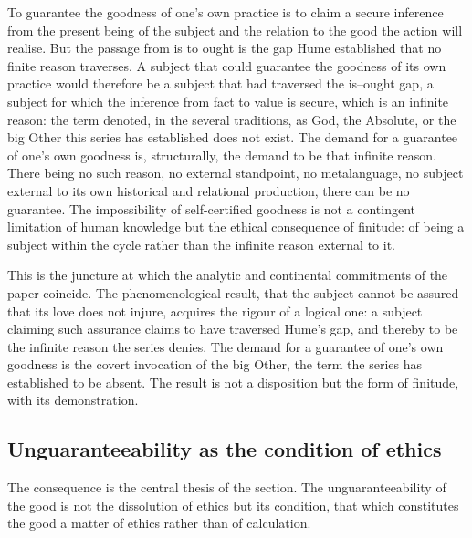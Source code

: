 \begin{claim}
To guarantee the goodness of one's own practice is to claim a secure inference from the present being of the subject and the relation to the good the action will realise. But the passage from is to ought is the gap Hume established that no finite reason traverses. A subject that could guarantee the goodness of its own practice would therefore be a subject that had traversed the is--ought gap, a subject for which the inference from fact to value is secure, which is an infinite reason: the term denoted, in the several traditions, as God, the Absolute, or the big Other this series has established does not exist. The demand for a guarantee of one's own goodness is, structurally, the demand to be that infinite reason. There being no such reason, no external standpoint, no metalanguage, no subject external to its own historical and relational production, there can be no guarantee. The impossibility of self-certified goodness is not a contingent limitation of human knowledge but the ethical consequence of finitude: of being a subject within the cycle rather than the infinite reason external to it.
\end{claim}

\noindent
This is the juncture at which the analytic and continental commitments of the paper coincide. The phenomenological result, that the subject cannot be assured that its love does not injure, acquires the rigour of a logical one: a subject claiming such assurance claims to have traversed Hume's gap, and thereby to be the infinite reason the series denies. The demand for a guarantee of one's own goodness is the covert invocation of the big Other, the term the series has established to be absent. The result is not a disposition but the form of finitude, with its demonstration.

\subsection{Unguaranteeability as the condition of ethics}
\label{p10:sec:reversal}

The consequence is the central thesis of the section. The unguaranteeability of the good is not the dissolution of ethics but its condition, that which constitutes the good a matter of ethics rather than of calculation.

